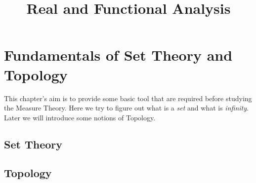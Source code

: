 \documentclass[11pt,twoside]{article}
\title{Real and Functional Analysis}
\begin{document}
\pagestyle{empty}


 \clearpage \restoregeometry
 \clearpage



\cleardoublepage

\pagestyle{plain}

\setcounter{tocdepth}{3}
\begin{spacing}{0.95} %
	\tableofcontents
\end{spacing}

\cleardoublepage

\section{Fundamentals of Set Theory and Topology}
This chapter's aim is to provide some basic tool that are required before studying the Measure Theory. Here we try to figure out what is a \textit{set} and what is \textit{infinity}. Later we will introduce some notions of Topology.

\subsection{Set Theory}





\newpage
\subsection{Topology}\label{topology-section}








 

%
\end{document}
